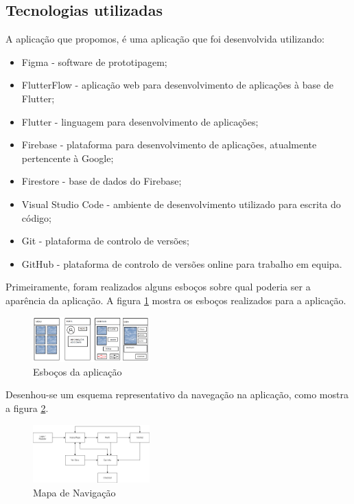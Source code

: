 \documentclass[conference]{IEEEtran}
\begin{document}
\subsection{Tecnologias utilizadas}

A aplicação que propomos, é uma aplicação que foi desenvolvida utilizando:

\begin{itemize}
    \item Figma - software de prototipagem;
    \item FlutterFlow - aplicação web para desenvolvimento de aplicações à base de Flutter;
    \item Flutter - linguagem para desenvolvimento de aplicações;
    \item Firebase - plataforma para desenvolvimento de aplicações, atualmente pertencente à Google;
    \item Firestore - base de dados do Firebase;
    \item Visual Studio Code - ambiente de desenvolvimento utilizado para escrita do código;
    \item Git - plataforma de controlo de versões;
    \item GitHub - plataforma de controlo de versões online para trabalho em equipa.
\end{itemize}

Primeiramente, foram realizados alguns esboços sobre qual poderia ser a aparência da aplicação. A figura \ref{fig:sketches} 
mostra os esboços realizados para a aplicação.

\begin{figure}[ht]
    \centering
    \includegraphics[width=0.4\textwidth]{appsketches.png}
    \caption{Esboços da aplicação}
    \label{fig:sketches}
\end{figure}

Desenhou-se um esquema representativo da navegação na aplicação, como mostra a figura \ref{fig:navmap}.

\begin{figure}[ht]
    \centering
    \includegraphics[width=0.4\textwidth]{artstore+map.drawio.png}
    \caption{Mapa de Navigação}
    \label{fig:navmap}
\end{figure}
\end{document}
